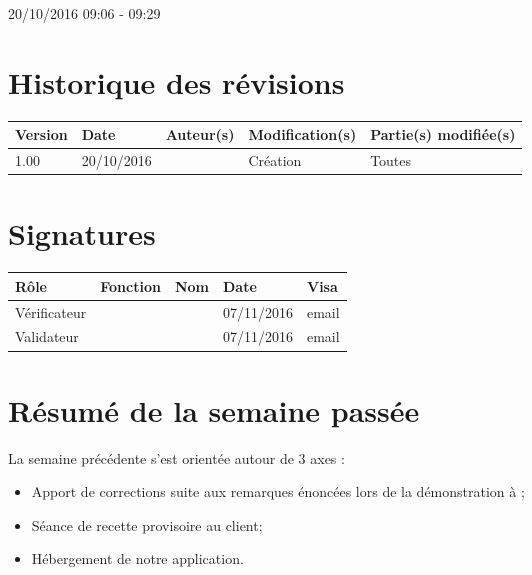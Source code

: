 \documentclass [a4paper] {article}
\begin{document}
20/10/2016			 				%
\hfill   
\hfill 	 09:06 - 09:29				%


\section*{Historique des révisions}
\begin{center}
			\begin{tabular}{| p{2.5cm} | p{3cm} | p{3cm} | p{3cm} | p{3.5cm} |}
				\hline
				\rowcolor{Gray}
				Version & Date & Auteur(s) & Modification(s) & Partie(s) modifiée(s)		 \\
				\hline
				1.00 & 20/10/2016 & \Kafui & Création & Toutes \\
				\hline			
			\end{tabular}
		\end{center}

\section*{Signatures}

		\begin{center}
			\begin{tabular}{| p{2.5cm} | p{4cm} | p{3cm} | p{3cm} | p{2.5cm} |}
				\hline
				\rowcolor{Gray}
				Rôle & Fonction & Nom & Date & Visa		 \\
				\hline
				Vérificateur & \RGC & \Melissa & 07/11/2016 & email \\[30pt]
				\hline
				Validateur & \CP & \Pierre &  07/11/2016 & email \\[30pt]	
				\hline
			\end{tabular}
		\end{center}

\section{Résumé de la semaine passée}
La semaine précédente s'est orientée autour de 3 axes :  
\begin{itemize}
	\item Apport de corrections suite aux remarques énoncées lors de la démonstration à 		\nomTuteurPedago;
	\item Séance de recette provisoire au client;
	\item Hébergement de notre application.
\end{itemize} 
\end{document}
